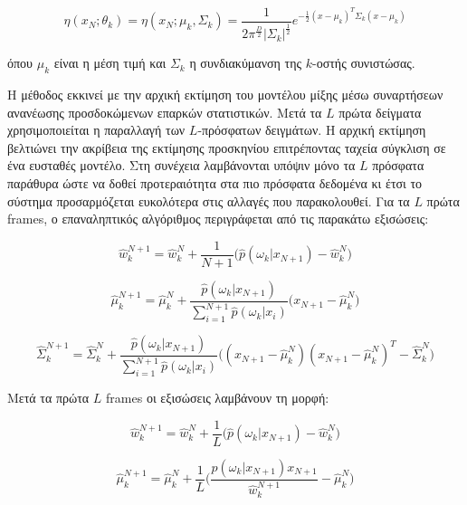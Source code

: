 \documentclass[11pt,a4paper,english,greek,twoside]{../Thesis}
\begin{document}
\begin{equation}\label{eq:Gaussian}
    \eta(x_N; \theta_{k})=\eta(x_N; \mu_{k}, \Sigma_{k})=\frac{1}{2\pi^{\frac{D}{2}} | \Sigma_{k} |^{\frac{1}{2}}}e^{-\frac{1}{2}(x-\mu_k)^{T}\Sigma_{k}(x-\mu_k)}
\end{equation}

όπου $\mu_{k}$ είναι η μέση τιμή και $\Sigma_{k}$ η συνδιακύμανση της $k$-οστής συνιστώσας.

\par Η μέθοδος εκκινεί με την αρχική εκτίμηση του μοντέλου μίξης μέσω συναρτήσεων ανανέωσης προσδοκώμενων επαρκών στατιστικών. Μετά τα $L$ πρώτα δείγματα χρησιμοποιείται η παραλλαγή των $L$-πρόσφατων δειγμάτων. Η αρχική εκτίμηση βελτιώνει την ακρίβεια της εκτίμησης προσκηνίου επιτρέποντας ταχεία σύγκλιση σε ένα ευσταθές μοντέλο. Στη συνέχεια λαμβάνονται υπόψιν μόνο τα $L$ πρόσφατα παράθυρα ώστε να δοθεί προτεραιότητα στα πιο πρόσφατα δεδομένα κι έτσι το σύστημα προσαρμόζεται ευκολότερα στις αλλαγές που παρακολουθεί.
Για τα $L$ πρώτα frames, ο επαναληπτικός αλγόριθμος περιγράφεται από τις παρακάτω εξισώσεις:

\begin{equation}\label{eq:weight1}
    \hat{w}_{k}^{N+1}=\hat{w}_{k}^{N}+\frac{1}{N+1} \big( \hat{p}(\omega_{k}|x_{N+1})-\hat{w}_{k}^{N} \big)
\end{equation}

\begin{equation}\label{eq:mean1}
    \hat{\mu}_{k}^{N+1}=\hat{\mu}_{k}^{N}+\frac{\hat{p}(\omega_{k}|x_{N+1})}{\sum_{i=1}^{N+1}\hat{p}(\omega_{k}|x_{i})} \big( x_{N+1}-\hat{\mu}_{k}^{N} \big)
\end{equation}

\begin{equation}\label{eq:cov1}
    \hat{\Sigma}_{k}^{N+1}=\hat{\Sigma}_{k}^{N}+\frac{\hat{p}(\omega_{k}|x_{N+1})}{\sum_{i=1}^{N+1}\hat{p}(\omega_{k}|x_{i})} \big( (x_{N+1}-\hat{\mu}_{k}^{N})(x_{N+1}-\hat{\mu}_{k}^{N})^{T}-\hat{\Sigma}_{k}^{N} \big)
\end{equation}

Μετά τα πρώτα $L$ frames οι εξισώσεις λαμβάνουν τη μορφή:

\begin{equation}\label{eq:weight2}
    \hat{w}_{k}^{N+1}=\hat{w}_{k}^{N}+\frac{1}{L} \big( \hat{p}(\omega_{k}|x_{N+1})-\hat{w}_{k}^{N} \big)
\end{equation}

\begin{equation}\label{eq:mean2}
    \hat{\mu}_{k}^{N+1}=\hat{\mu}_{k}^{N}+\frac{1}{L} \big( \frac{\hat{p}(\omega_{k}|x_{N+1})x_{N+1}}{\hat{w}_{k}^{N+1}}-\hat{\mu}_{k}^{N} \big)
\end{equation}
\end{document}
